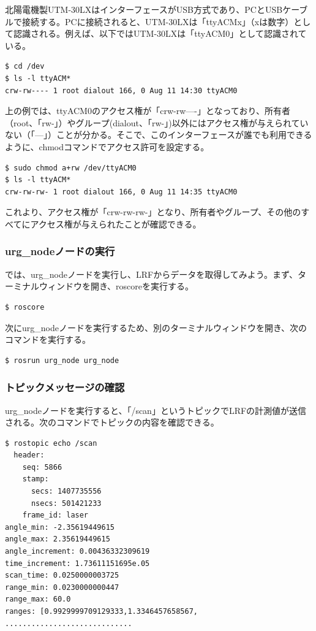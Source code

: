 北陽電機製UTM-30LXはインターフェースがUSB方式であり、PCとUSBケーブルで接続する。PCに接続されると、UTM-30LXは「ttyACMx」（xは数字）として認識される。例えば、以下ではUTM-30LXは「ttyACM0」として認識されている。

\begin{lstlisting}[language=ROS]
$ cd /dev
$ ls -l ttyACM*
crw-rw---- 1 root dialout 166, 0 Aug 11 14:30 ttyACM0
\end{lstlisting}

上の例では、ttyACM0のアクセス権が「crw-rw----」となっており、所有者（root、「rw-」）やグループ(dialout、「rw-」)以外にはアクセス権が与えられていない（「---」）ことが分かる。そこで、このインターフェースが誰でも利用できるように、chmodコマンドでアクセス許可を設定する。

\begin{lstlisting}[language=ROS]
$ sudo chmod a+rw /dev/ttyACM0
$ ls -l ttyACM*
crw-rw-rw- 1 root dialout 166, 0 Aug 11 14:35 ttyACM0
\end{lstlisting}

これより、アクセス権が「crw-rw-rw-」となり、所有者やグループ、その他のすべてにアクセス権が与えられたことが確認できる。

\subsubsection{urg\_nodeノードの実行}

では、urg\_nodeノードを実行し、LRFからデータを取得してみよう。まず、ターミナルウィンドウを開き、roscoreを実行する。

\begin{lstlisting}[language=ROS]
$ roscore
\end{lstlisting}

次にurg\_nodeノードを実行するため、別のターミナルウィンドウを開き、次のコマンドを実行する。

\begin{lstlisting}[language=ROS]
$ rosrun urg_node urg_node
\end{lstlisting}

\subsubsection{トピックメッセージの確認}

urg\_nodeノードを実行すると、「/scan」というトピックでLRFの計測値が送信される。次のコマンドでトピックの内容を確認できる。

\begin{lstlisting}[language=ROS]
$ rostopic echo /scan
  header:
    seq: 5866
    stamp:
      secs: 1407735556
      nsecs: 501421233
    frame_id: laser
angle_min: -2.35619449615
angle_max: 2.35619449615
angle_increment: 0.00436332309619
time_increment: 1.73611151695e.05
scan_time: 0.0250000003725
range_min: 0.0230000000447
range_max: 60.0
ranges: [0.9929999709129333,1.3346457658567, .............................
\end{lstlisting}

